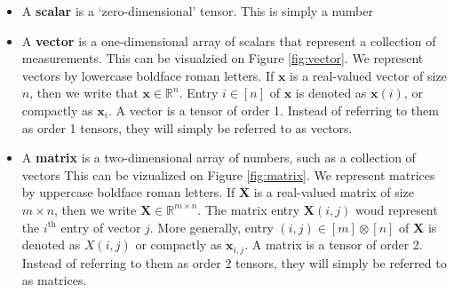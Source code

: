     \begin{itemize}
        \item A \textbf{scalar} is a `zero-dimensional' tensor. This is simply a
        number
        \item A \textbf{vector} is a one-dimensional array of scalars that
        represent a collection of measurements. This can be visualzied on Figure
        \ref{fig:vector}. We represent vectors by lowercase boldface roman
        letters. If $\mathbf{x}$ is a real-valued vector of size $n$, then we
        write that $\mathbf{x} \in \mathbb{R}^n$. Entry $i\in [n]$ of
        $\mathbf{x}$ is denoted as $\mathbf{x}(i)$, or compactly as
        $\mathbf{x}_i$. A vector is a tensor of order 1. Instead of referring to
        them as order 1 tensors, they will simply be referred to as vectors. 
        \item A \textbf{matrix} is a two-dimensional array of numbers, such
        as a collection of vectors This can be vizualized on Figure
        \ref{fig:matrix}. We represent matrices by uppercase boldface roman
        letters. If $\mathbf{X}$ is a real-valued matrix of size $m\times
        n$, then we write $\mathbf{X}\in \mathbb{R}^{m\times n}$. The matrix
        entry $\mathbf{X}(i, j)$ woud represent the $i^\text{th}$ entry of
        vector $j$. More generally, entry $(i, j)\in [m] \otimes [n]$ of
        $\mathbf{X}$ is denoted as $X(i, j)$ or compactly as $\mathbf{x}_{i,
        j}$. A matrix is a tensor of order 2. Instead of referring to
        them as order 2 tensors, they will simply be referred to as matrices.
    \end{itemize}


